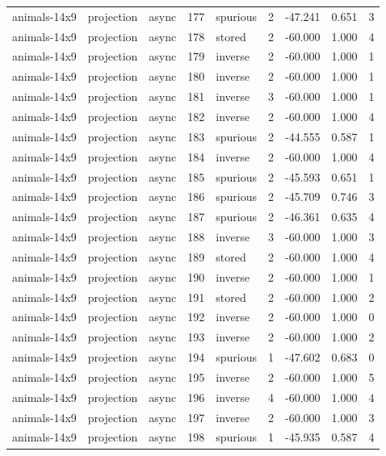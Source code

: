\begin{tabular}{lllrlrrrr}
animals-14x9 & projection & async & 177 & spurious & 2 & -47.241 & 0.651 & 3 \\
animals-14x9 & projection & async & 178 & stored & 2 & -60.000 & 1.000 & 4 \\
animals-14x9 & projection & async & 179 & inverse & 2 & -60.000 & 1.000 & 1 \\
animals-14x9 & projection & async & 180 & inverse & 2 & -60.000 & 1.000 & 1 \\
animals-14x9 & projection & async & 181 & inverse & 3 & -60.000 & 1.000 & 1 \\
animals-14x9 & projection & async & 182 & inverse & 2 & -60.000 & 1.000 & 4 \\
animals-14x9 & projection & async & 183 & spurious & 2 & -44.555 & 0.587 & 1 \\
animals-14x9 & projection & async & 184 & inverse & 2 & -60.000 & 1.000 & 4 \\
animals-14x9 & projection & async & 185 & spurious & 2 & -45.593 & 0.651 & 1 \\
animals-14x9 & projection & async & 186 & spurious & 2 & -45.709 & 0.746 & 3 \\
animals-14x9 & projection & async & 187 & spurious & 2 & -46.361 & 0.635 & 4 \\
animals-14x9 & projection & async & 188 & inverse & 3 & -60.000 & 1.000 & 3 \\
animals-14x9 & projection & async & 189 & stored & 2 & -60.000 & 1.000 & 4 \\
animals-14x9 & projection & async & 190 & inverse & 2 & -60.000 & 1.000 & 1 \\
animals-14x9 & projection & async & 191 & stored & 2 & -60.000 & 1.000 & 2 \\
animals-14x9 & projection & async & 192 & inverse & 2 & -60.000 & 1.000 & 0 \\
animals-14x9 & projection & async & 193 & inverse & 2 & -60.000 & 1.000 & 2 \\
animals-14x9 & projection & async & 194 & spurious & 1 & -47.602 & 0.683 & 0 \\
animals-14x9 & projection & async & 195 & inverse & 2 & -60.000 & 1.000 & 5 \\
animals-14x9 & projection & async & 196 & inverse & 4 & -60.000 & 1.000 & 4 \\
animals-14x9 & projection & async & 197 & inverse & 2 & -60.000 & 1.000 & 3 \\
animals-14x9 & projection & async & 198 & spurious & 1 & -45.935 & 0.587 & 4 \\

\end{tabular}

